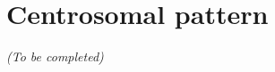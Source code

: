 




\section{Centrosomal pattern}
\label{sec:centrosomal}

\begin{center}
	\textit{(To be completed)}
\end{center}

